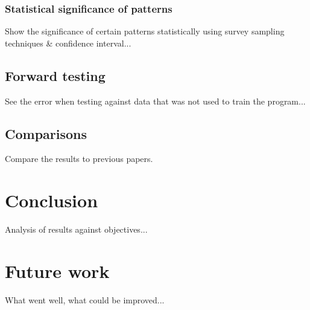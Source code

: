 \documentclass{article}
\begin{document}
\subsubsection{Statistical significance of patterns}

Show the significance of certain patterns statistically using survey sampling techniques \& confidence interval...

\subsection{Forward testing}

See the error when testing against data that was not used to train the program...

\subsection{Comparisons}

Compare the results to previous papers.

\section{Conclusion}

Analysis of results against objectives...

\section{Future work}

What went well, what could be improved...



\end{document}
